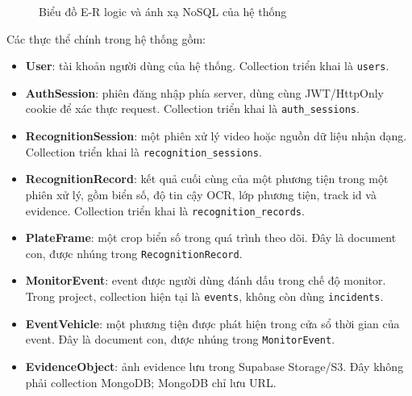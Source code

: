\documentclass[../DoAn.tex]{subfiles}
\begin{document}
\begin{figure}[htbp]
{%
    }
    \caption{Biểu đồ E-R logic và ánh xạ NoSQL của hệ thống}
    \label{fig:database-er}
\end{figure}

Các thực thể chính trong hệ thống gồm:

\begin{itemize}
    \item \textbf{User}: tài khoản người dùng của hệ thống. Collection triển khai là \texttt{users}.
    \item \textbf{AuthSession}: phiên đăng nhập phía server, dùng cùng JWT/HttpOnly cookie để xác thực request. Collection triển khai là \texttt{auth\_sessions}.
    \item \textbf{RecognitionSession}: một phiên xử lý video hoặc nguồn dữ liệu nhận dạng. Collection triển khai là \texttt{recognition\_sessions}.
    \item \textbf{RecognitionRecord}: kết quả cuối cùng của một phương tiện trong một phiên xử lý, gồm biển số, độ tin cậy OCR, lớp phương tiện, track id và evidence. Collection triển khai là \texttt{recognition\_records}.
    \item \textbf{PlateFrame}: một crop biển số trong quá trình theo dõi. Đây là document con, được nhúng trong \texttt{RecognitionRecord}.
    \item \textbf{MonitorEvent}: event được người dùng đánh dấu trong chế độ monitor. Trong project, collection hiện tại là \texttt{events}, không còn dùng \texttt{incidents}.
    \item \textbf{EventVehicle}: một phương tiện được phát hiện trong cửa sổ thời gian của event. Đây là document con, được nhúng trong \texttt{MonitorEvent}.
    \item \textbf{EvidenceObject}: ảnh evidence lưu trong Supabase Storage/S3. Đây không phải collection MongoDB; MongoDB chỉ lưu URL.
\end{itemize}
\end{document}
